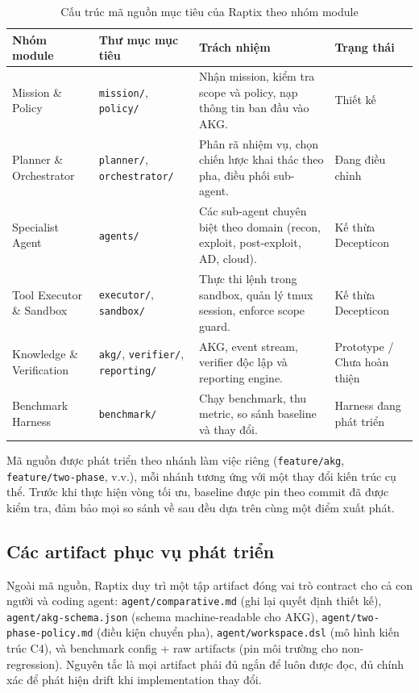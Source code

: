 \begin{table}[H]
\centering
\caption{Cấu trúc mã nguồn mục tiêu của Raptix theo nhóm module}
\label{tab:to-chuc-ma-nguon}
\small
\renewcommand{\arraystretch}{1.3}
\begin{tabular}{|p{2.8cm}|p{4cm}|p{5.8cm}|p{2.8cm}|}
\hline
\textbf{Nhóm module} & \textbf{Thư mục mục tiêu} & \textbf{Trách nhiệm} & \textbf{Trạng thái} \\
\hline
Mission \& Policy & \texttt{mission/}, \texttt{policy/} & Nhận mission, kiểm tra scope và policy, nạp thông tin ban đầu vào AKG. & Thiết kế \\
\hline
Planner \& Orchestrator & \texttt{planner/}, \texttt{orchestrator/} & Phân rã nhiệm vụ, chọn chiến lược khai thác theo pha, điều phối sub-agent. & Đang điều chỉnh \\
\hline
Specialist Agent & \texttt{agents/} & Các sub-agent chuyên biệt theo domain (recon, exploit, post-exploit, AD, cloud). & Kế thừa Decepticon \\
\hline
Tool Executor \& Sandbox & \texttt{executor/}, \texttt{sandbox/} & Thực thi lệnh trong sandbox, quản lý tmux session, enforce scope guard. & Kế thừa Decepticon \\
\hline
Knowledge \& Verification & \texttt{akg/}, \texttt{verifier/}, \texttt{reporting/} & AKG, event stream, verifier độc lập và reporting engine. & Prototype / Chưa hoàn thiện \\
\hline
Benchmark Harness & \texttt{benchmark/} & Chạy benchmark, thu metric, so sánh baseline và thay đổi. & Harness đang phát triển \\
\hline
\end{tabular}
\end{table}

Mã nguồn được phát triển theo nhánh làm việc riêng (\texttt{feature/akg}, \texttt{feature/two-phase}, v.v.), mỗi nhánh tương ứng với một thay đổi kiến trúc cụ thể. Trước khi thực hiện vòng tối ưu, baseline được pin theo commit đã được kiểm tra, đảm bảo mọi so sánh về sau đều dựa trên cùng một điểm xuất phát.



\subsection{Các artifact phục vụ phát triển}
\label{sec:cac-artifact}

Ngoài mã nguồn, Raptix duy trì một tập artifact đóng vai trò contract cho cả con người và coding agent: \texttt{agent/comparative.md} (ghi lại quyết định thiết kế), \texttt{agent/akg-schema.json} (schema machine-readable cho AKG), \texttt{agent/two-phase-policy.md} (điều kiện chuyển pha), \texttt{agent/workspace.dsl} (mô hình kiến trúc C4), và benchmark config + raw artifacts (pin môi trường cho non-regression). Nguyên tắc là mọi artifact phải đủ ngắn để luôn được đọc, đủ chính xác để phát hiện drift khi implementation thay đổi.


